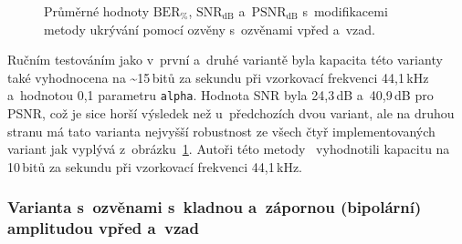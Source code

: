 \begin{figure}[H]
    \table
    \centering
    \caption{Průměrné hodnoty $\mathrm{BER}_{\%}$, $\mathrm{SNR}_\mathrm{dB}$
    a~$\mathrm{PSNR}_\mathrm{dB}$ s~modifikacemi metody ukrývání pomocí
    ozvěny s~ozvěnami vpřed a~vzad.}
    \label{pic:modifications-mean-values-echo-bf}
\end{figure}

Ručním testováním jako v~první a~druhé variantě byla kapacita této varianty
také vyhodnocena na \textasciitilde15\,bitů za sekundu při vzorkovací frekvenci
44,1\,kHz a~hodnotou 0,1 parametru \texttt{alpha}. Hodnota SNR byla 24,3\,dB
a~40,9\,dB pro PSNR, což je sice horší výsledek než u~předchozích dvou variant,
ale na druhou stranu má tato varianta nejvyšší robustnost ze všech čtyř
implementovaných variant jak vyplývá
z~obrázku~\ref{pic:modifications-mean-values-echo-bf}. Autoři této
metody~\cite{Kim2003} vyhodnotili kapacitu na 10\,bitů za sekundu při
vzorkovací frekvenci 44,1\,kHz.

\subsubsection*{Varianta s~ozvěnami s~kladnou a~zápornou (bipolární) amplitudou
vpřed a~vzad}

